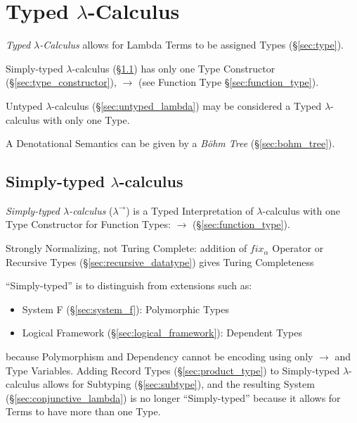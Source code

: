 \section{Typed $\lambda$-Calculus}\label{sec:typed_lambda}

\emph{Typed $\lambda$-Calculus} allows for Lambda Terms to be assigned
Types (\S\ref{sec:type}).

Simply-typed $\lambda$-calculus (\S\ref{sec:simply_typed}) has only
one Type Constructor (\S\ref{sec:type_constructor}), $\rightarrow$
(see Function Type \S\ref{sec:function_type}).

Untyped $\lambda$-calculus (\S\ref{sec:untyped_lambda}) may be
considered a Typed $\lambda$-calculus with only one Type.

A Denotational Semantics can be given by a \emph{B\"ohm Tree}
(\S\ref{sec:bohm_tree}).



\subsection{Simply-typed $\lambda$-calculus}\label{sec:simply_typed}

\emph{Simply-typed $\lambda$-calculus} ($\lambda^\rightarrow$) is a
Typed Interpretation of $\lambda$-calculus with one Type Constructor
for Function Types: $\rightarrow$ (\S\ref{sec:function_type}).

Strongly Normalizing, not Turing Complete: addition of $fix_\alpha$
Operator or Recursive Types (\S\ref{sec:recursive_datatype}) gives
Turing Completeness

``Simply-typed'' is to distinguish from extensions such as:
\begin{itemize}
  \item System F (\S\ref{sec:system_f}): Polymorphic Types
  \item Logical Framework (\S\ref{sec:logical_framework}): Dependent
    Types
\end{itemize}
because Polymorphism and Dependency cannot be encoding using only
$\rightarrow$ and Type Variables. Adding Record Types
(\S\ref{sec:product_type}) to Simply-typed $\lambda$-calculus allows
for Subtyping (\S\ref{sec:subtype}), and the resulting System
(\S\ref{sec:conjunctive_lambda}) is no longer ``Simply-typed'' because
it allows for Terms to have more than one Type.

